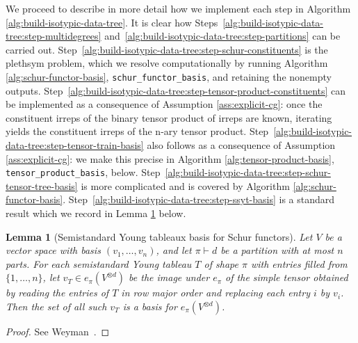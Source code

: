 \documentclass[11pt]{article}
\newcommand{\set}[1]{\{#1\}}
\newtheorem{lemma}[theorem]{Lemma}
\theoremstyle{definition}
\begin{document}
We proceed to describe in more detail how we implement each step in Algorithm \ref{alg:build-isotypic-data-tree}.
It is clear how Steps~\ref{alg:build-isotypic-data-tree:step-multidegrees} and~\ref{alg:build-isotypic-data-tree:step-partitions} can be carried out.
Step~\ref{alg:build-isotypic-data-tree:step-schur-constituents} is the plethsym problem, which we resolve computationally by running Algorithm \ref{alg:schur-functor-basis}, \texttt{schur\_functor\_basis}, and retaining the nonempty outputs.
Step~\ref{alg:build-isotypic-data-tree:step-tensor-product-constituents} can be implemented as a consequence of Assumption \ref{ass:explicit-cg}: once the constituent irreps of the binary tensor product of irreps are known, iterating yields the constituent irreps of the n-ary tensor product.
Step~\ref{alg:build-isotypic-data-tree:step-tensor-train-basis} also follows as a consequence of Assumption \ref{ass:explicit-cg}: we make this precise in Algorithm \ref{alg:tensor-product-basis}, \texttt{tensor\_product\_basis}, below.
Step~\ref{alg:build-isotypic-data-tree:step-schur-tensor-tree-basis} is more complicated and is covered by Algorithm \ref{alg:schur-functor-basis}.
Step~\ref{alg:build-isotypic-data-tree:step-ssyt-basis} is a standard result which we record in Lemma \ref{lem:ssyt-basis} below.

\begin{lemma}[Semistandard Young tableaux basis for Schur functors]\label{lem:ssyt-basis}
  Let $V$ be a vector space with basis $(v_1,\dots,v_n)$, and let $\pi\vdash d$ be a partition with at most $n$ parts.
  For each semistandard Young tableau $T$ of shape $\pi$ with entries filled from $\set{1,\dots,n}$, let $v_T\in e_\pi(V^{\otimes d})$ be the image under $e_\pi$ of the simple tensor obtained by reading the entries of $T$ in row major order and replacing each entry $i$ by $v_i$.
  Then the set of all such $v_T$ is a basis for $e_\pi(V^{\otimes d})$.
\end{lemma}
\begin{proof}
  See Weyman~\cite[Proposition~2.1.15(b)]{Weyman2003}.
\end{proof}
\end{document}
